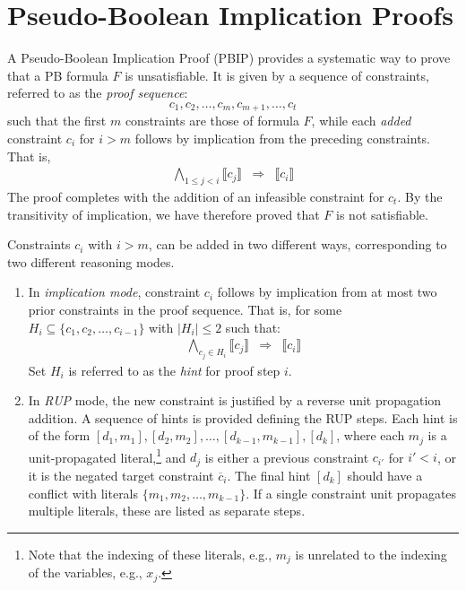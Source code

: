 \documentclass{easychair}
\newcommand{\mlit}{m}
\newcommand{\imply}{\Rightarrow}
\newcommand{\func}[1]{\llbracket#1\rrbracket}
\begin{document}
\section{Pseudo-Boolean Implication Proofs}

A Pseudo-Boolean Implication Proof (PBIP) provides a systematic way to
prove that a PB formula $F$ is unsatisfiable.  It is given by a sequence of constraints, referred to as the {\em proof sequence}:
\begin{displaymath}
  c_1, c_2, \ldots, c_m, c_{m+1}, \ldots, c_t
\end{displaymath}  
such that the first $m$ constraints are those of formula $F$, while each {\em added} constraint $c_i$
for  $i > m$ follows by implication from the preceding constraints.
That is, 
\begin{eqnarray}
\bigwedge_{1 \leq j < i} \func{c_j} & \imply & \func{c_i} \label{eqn:proofsequence}
\end{eqnarray}
The proof completes with the addition of an infeasible constraint for $c_t$.
By the transitivity of implication, we have therefore proved that $F$ is not satisfiable.

Constraints $c_{i}$ with $i > m$, can be added in two different ways, corresponding to two different reasoning modes.
\begin{enumerate}
\item In {\em implication mode}, constraint $c_i$ follows by implication from at most two prior constraints in the  proof sequence.
  That is, for some $H_i \subseteq \{c_1, c_2,
  \ldots, c_{i-1}\}$ with $|H_i| \leq 2$ such that:
\begin{eqnarray}
\bigwedge_{c_j \in H_i} \func{c_j} & \imply & \func{c_i} \label{eqn:implicationmode}
\end{eqnarray}
Set $H_i$ is referred to as the {\em hint} for proof step $i$.
\item In \emph{RUP} mode, the new constraint is justified by a reverse
  unit propagation addition.  A sequence of hints is provided defining the RUP steps.  Each hint is of the form
  $[d_1, \mlit_1], [d_2, \mlit_2], \ldots, [d_{k-1},\mlit_{k-1}], [d_k]$,
  where each $\mlit_j$ is a unit-propagated literal,\footnote{Note that the indexing of these literals, e.g., $\mlit_j$ is
  unrelated to the indexing of the variables, e.g., $x_j$.}
 and
  $d_{j}$ is either a previous constraint $c_{i'}$ for $i' < i$, or it is the negated target constraint $\overline{c}_i$.
  The final hint $[d_k]$ should have a conflict with literals $\{\mlit_1, \mlit_2, \ldots, \mlit_{k-1} \}$.
  If a single constraint unit propagates multiple literals, these are listed as separate steps.

\end{enumerate}
\end{document}
